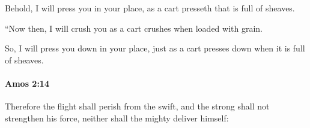 			\begin{versebox}
					\item[BHS] 
					\item[LXX] 
					\item[ASV] Behold, I will press you in your place, as a cart presseth that is full of sheaves.
					\item[NIV] “Now then, I will crush you as a cart crushes when loaded with grain.
					\item[NRSV] So, I will press you down in your place, just as a cart presses down when it is full of sheaves.
			\end{versebox}

		\paragraph{Amos 2:14} %
			\label{AMOS-2-14}

			Therefore the flight shall perish from the swift, and the strong shall not strengthen his force, neither shall the mighty deliver himself:

